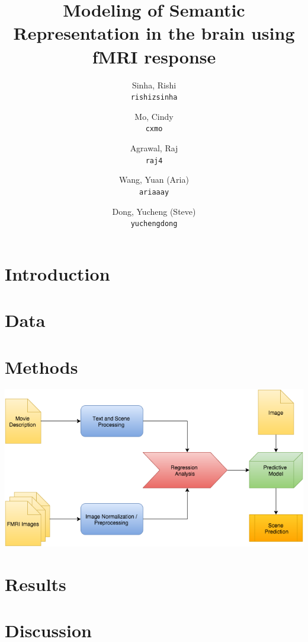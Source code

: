 \documentclass[12pt]{article}
\title{Modeling of Semantic Representation in the brain using fMRI response}
\author{
  Sinha, Rishi\\
  \texttt{rishizsinha}
  \and
  Mo, Cindy\\
  \texttt{cxmo}
  \and
  Agrawal, Raj\\
  \texttt{raj4}
  \and
  Wang, Yuan (Aria)\\
  \texttt{ariaaay}
  \and
  Dong, Yucheng (Steve)\\
  \texttt{yuchengdong}
}
\begin{document}
\maketitle{}

\abstract{}


\section{Introduction}
        

\section{Data}
        

\section{Methods}
        \includegraphics[width=\linewidth]{processflow}
        

\section{Results}
\section{Discussion}



\end{document}
